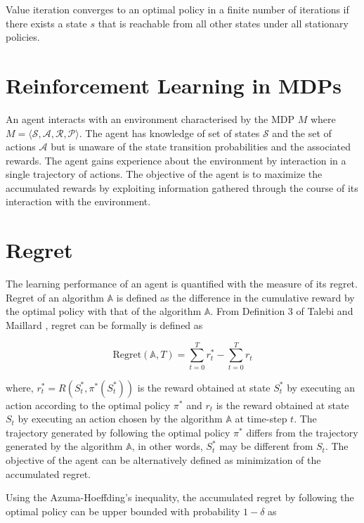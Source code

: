 Value iteration converges to an optimal policy in a finite number of iterations \cite{puterman_chapter_1990} if there exists a state $s$ that is reachable from all other states under all stationary policies.

\section{Reinforcement Learning in MDPs}

An agent interacts with an environment characterised by the MDP $M$ where $M = \langle \mathcal{S}, \mathcal{A}, \mathcal{R}, \mathcal{P} \rangle$.
The agent has knowledge of set of states $\mathcal{S}$ and the set of actions $\mathcal{A}$ but is unaware of the state transition probabilities and the associated rewards.
The agent gains experience about the environment by interaction in a single trajectory of actions.
The objective of the agent is to maximize the accumulated rewards by exploiting information gathered through the course of its interaction with the environment.

\section{Regret}

The learning performance of an agent is quantified with the measure of its regret.
Regret of an algorithm $\mathbb{A}$ is defined as the difference in the cumulative reward by the optimal policy with that of the algorithm $\mathbb{A}$.
From Definition 3 of Talebi and Maillard \cite{talebi_variance-aware_2018}, regret can be formally is defined as

\begin{equation}
    \label{eqn:regret}
    \text{Regret}(\mathbb{A}, T) = \sum_{t = 0}^T r^*_t - \sum_{t = 0}^T r_t 
\end{equation}

where, $r^*_t = R(S^*_t, \pi^*(S^*_t))$ is the reward obtained at state $S^*_t$ by executing an action according to the optimal policy $\pi^*$ and $r_t$ is the reward obtained at state $S_t$ by executing an action chosen by the algorithm $\mathbb{A}$ at time-step $t$.
The trajectory generated by following the optimal policy $\pi^*$ differs from the trajectory generated by the algorithm $\mathbb{A}$, in other words, $S^*_t$ may be different from $S_t$.
The objective of the agent can be alternatively defined as minimization of the accumulated regret.

Using the Azuma-Hoeffding's inequality, the accumulated regret by following the optimal policy can be upper bounded with probability $1 - \delta$ as

